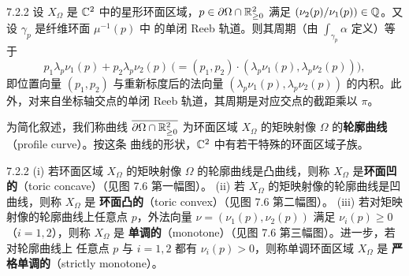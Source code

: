 \begin{wprop}{7.2.2}
  设 $X_\Omega$ 是 $\mathbb{C}^2$ 中的星形环面区域，$p\in\partial\Omega\cap\mathbb{R}^2_{\ge0}$
  满足 $(\nu_2(p)/\nu_1(p))\in\mathbb{Q}$。又设 $\gamma_p$ 是纤维环面 $\mu^{-1}(p)$ 中
  的单闭 Reeb 轨道。则其周期（由 $\int_{\gamma_p}\alpha$ 定义）等于
  \[
    p_1\lambda_p\nu_1(p)+p_2\lambda_p\nu_2(p)
    \ \bigl(=(p_1,p_2)\cdot(\lambda_p\nu_1(p),\lambda_p\nu_2(p))\bigr),
  \]
  即位置向量 $(p_1,p_2)$ 与重新标度后的法向量
  $(\lambda_p\nu_1(p),\lambda_p\nu_2(p))$ 的内积。此外，对来自坐标轴交点的单闭
  Reeb 轨道，其周期是对应交点的截距乘以 $\pi$。
\end{wprop}


为简化叙述，我们称曲线 $\overline{\partial\Omega\cap\mathbb{R}^2_{\ge0}}$ 为环面区域
$X_\Omega$ 的矩映射像 $\Omega$ 的\textbf{轮廓曲线}（profile curve）。按这条
曲线的形状，$\mathbb{C}^2$ 中有若干特殊的环面区域子族。

\begin{wdefn}{7.2.2}
  (i) 若环面区域 $X_\Omega$ 的矩映射像 $\Omega$ 的轮廓曲线是凸曲线，则称
  $X_\Omega$ 是\textbf{环面凹的}（toric concave）（见图 7.6 第一幅图）。
  (ii) 若 $X_\Omega$ 的矩映射像的轮廓曲线是凹曲线，则称 $X_\Omega$ 是
  \textbf{环面凸的}（toric convex）（见图 7.6 第二幅图）。
  (iii) 若对矩映射像的轮廓曲线上任意点 $p$，外法向量
  $\nu=(\nu_1(p),\nu_2(p))$ 满足 $\nu_i(p)\ge0$（$i=1,2$），则称 $X_\Omega$ 是
  \textbf{单调的}（monotone）（见图 7.6 第三幅图）。进一步，若对轮廓曲线上
  任意点 $p$ 与 $i=1,2$ 都有 $\nu_i(p)>0$，则称单调环面区域 $X_\Omega$ 是
  \textbf{严格单调的}（strictly monotone）。
\end{wdefn}


